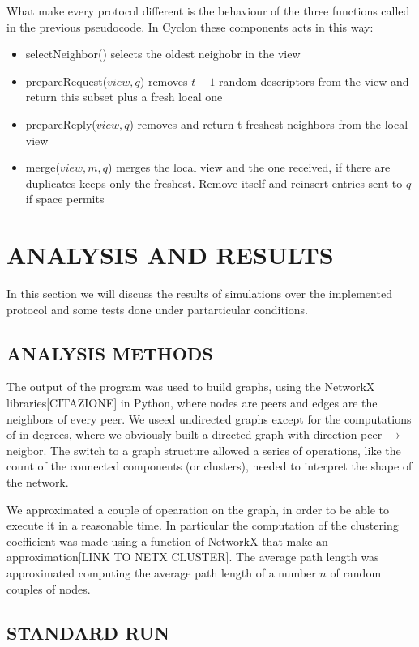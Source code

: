 \documentclass[a4paper,12pt,notitlepage]{article} %
\begin{document}
What make every protocol different is the behaviour of
 the three functions called in the previous pseudocode. In Cyclon these components acts
 in this way:

\begin{itemize}
	\item selectNeighbor() selects the oldest neighobr in the view
	\item prepareRequest(\(view, q\)) removes \(t-1\) random descriptors from the view and return this 
	subset plus a fresh local one
	\item prepareReply(\(view, q\)) removes and return t freshest neighbors from the local view
	\item merge(\(view, m, q\)) merges the local view and the one received, if there are duplicates keeps only the 
	freshest. Remove itself and reinsert entries sent to \(q\) if space permits
\end{itemize}


\section{ANALYSIS AND RESULTS}

In this section we will discuss the results of simulations over the implemented protocol and some tests done under
 partarticular conditions.

\subsection{ANALYSIS METHODS}

The output of the program was used to build  graphs, using the NetworkX libraries[CITAZIONE] in Python, where
 nodes are peers and edges are the neighbors of every peer. We useed undirected graphs except for the 
 computations of in-degrees, where we obviously built a directed graph with direction peer \(\rightarrow\) neigbor.
 The switch to a graph structure allowed a series of operations, like the count of the connected components (or clusters), 
 needed to interpret the shape of the network.

We approximated a couple of opearation on the graph, in order to be able to execute it in a reasonable time. In 
 particular the computation of the clustering coefficient was made using a function of NetworkX that make an approximation[LINK TO NETX CLUSTER]. The average path length was approximated computing the average path length of a number \(n\) of random couples of nodes.


\subsection{STANDARD RUN}
\end{document}
